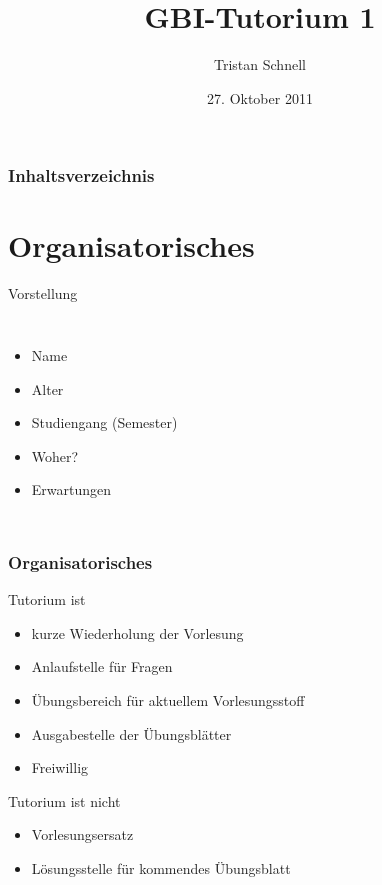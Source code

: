 \documentclass{beamer}
\author{Tristan Schnell}
\title{GBI-Tutorium 1}
\date{27. Oktober 2011}
\begin{document}
\begin{frame}
	\titlepage
\end{frame}

\begin{frame}
	\frametitle{Inhaltsverzeichnis}
	\tableofcontents
\end{frame}

\section{Organisatorisches}

\begin {frame}

	\begin{block}{Vorstellung}
		\begin{columns}
               			\begin{itemize}
					\item Name
					\item Alter
					\item Studiengang (Semester)
					\item Woher?
					\item Erwartungen
				\end{itemize}
		\end{columns}
	\end{block}
\end {frame}

\begin {frame}
	\frametitle {Organisatorisches}
	\begin{block}{Tutorium ist}
        		\begin{itemize}
			\item kurze Wiederholung der Vorlesung
			\item Anlaufstelle für Fragen
			\item Übungsbereich für aktuellem Vorlesungsstoff
			\item Ausgabestelle der Übungsblätter
			\item Freiwillig
		\end{itemize}
	\end{block}
	\pause
	\begin{block}{Tutorium ist nicht}
        		\begin{itemize}
			\item Vorlesungsersatz
			\item Lösungsstelle für kommendes Übungsblatt
		\end{itemize}
	\end{block}
\end {frame}
\end{document}
